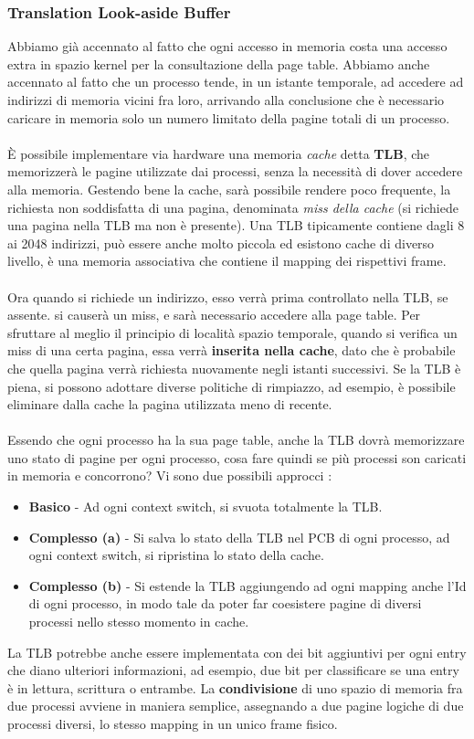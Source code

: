 \documentclass[12pt, letterpaper]{article}
\newcommand{\acc}{\\\hphantom{}\\}
\begin{document}
\subsubsection{Translation Look-aside Buffer }
Abbiamo già accennato al fatto che ogni accesso in memoria costa una accesso extra in spazio kernel per la 
consultazione della page table. Abbiamo anche accennato al fatto che un processo tende, in un istante 
temporale, ad accedere ad indirizzi di memoria vicini fra loro, arrivando alla conclusione che è necessario caricare 
in memoria solo un numero limitato della pagine totali di un processo.\acc È possibile 
implementare via hardware una memoria \textit{cache} detta \textbf{TLB}, che memorizzerà le pagine utilizzate 
dai processi, senza la necessità di dover accedere alla memoria. Gestendo bene la cache, sarà possibile rendere poco 
frequente, la richiesta non soddisfatta di una pagina, denominata \textit{miss della cache} (si richiede una pagina 
nella TLB ma non è presente). Una TLB tipicamente contiene dagli 8 ai 2048 indirizzi, può essere anche molto piccola 
ed esistono cache di diverso livello, è una memoria associativa che contiene il mapping dei rispettivi frame. \acc 
Ora quando si richiede un indirizzo, esso verrà prima controllato nella TLB, se assente. si causerà un miss, e sarà 
necessario accedere alla page table. Per sfruttare al meglio il principio di località spazio temporale, quando 
si verifica un miss di una certa pagina, essa verrà \textbf{inserita nella cache}, dato che è probabile che quella pagina 
verrà richiesta nuovamente negli istanti successivi. Se la TLB è piena, si possono adottare diverse politiche di rimpiazzo, 
ad esempio, è possibile eliminare dalla cache la pagina utilizzata meno di recente.\acc
Essendo che ogni processo ha la sua page table, anche la TLB dovrà memorizzare uno stato di pagine per ogni processo, 
cosa fare quindi se più processi son caricati in memoria e concorrono? Vi sono due possibili approcci :\begin{itemize}
    \item \textbf{Basico} - Ad ogni context switch, si svuota totalmente la TLB.
    \item \textbf{Complesso (a)} - Si salva lo stato della TLB nel PCB di ogni processo, ad ogni 
    context switch, si ripristina lo stato della cache.
    \item \textbf{Complesso (b)} - Si estende la TLB aggiungendo ad ogni mapping anche l'Id di ogni processo, 
    in modo tale da poter far coesistere pagine di diversi processi nello stesso momento in cache.
\end{itemize}
La TLB potrebbe anche essere implementata con dei bit aggiuntivi per ogni entry che diano ulteriori informazioni, ad esempio, 
due bit per classificare se una entry è in lettura, scrittura o entrambe. La \textbf{condivisione} di uno spazio di memoria 
fra due processi avviene in maniera semplice, assegnando a due pagine logiche di due processi diversi, lo stesso mapping 
in un unico frame fisico.
\end{document}
